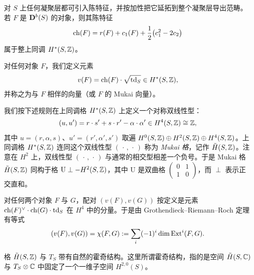 对 $S$ 上任何凝聚层都可引入陈特征，并按加性把它延拓到整个凝聚层导出范畴。若 $F$ 是 $\mathbf{D}^{b}(S)$ 的对象，则其陈特征
\begin{equation*}
\operatorname{ch}(F)=r(F)+c_1(F)+\frac{1}{2}\bigl(c_1^2-2c_2\bigr)
\end{equation*}
属于整上同调 $H^*(S,\mathbb{Z})$。

对任何对象 $F$，我们定义元素
\begin{equation*}
v(F)=\operatorname{ch}(F)\cdot\sqrt{\operatorname{td}_S}\in H^*(S,\mathbb{Z}),
\end{equation*}
并称之为与 $F$ 相伴的向量（或 $F$ 的 Mukai 向量）。

我们按下述规则在上同调格 $H^*(S,\mathbb{Z})$ 上定义一个对称双线性型：
\begin{equation*}
(u,u')=r\cdot s'+s\cdot r'-\alpha\cdot\alpha'\in H^4(S,\mathbb{Z})\cong\mathbb{Z},
\end{equation*}
其中 $u=(r,\alpha,s)$、$u'=(r',\alpha',s')$ 取遍 $H^0(S,\mathbb{Z})\oplus H^2(S,\mathbb{Z})\oplus H^4(S,\mathbb{Z})$。上同调格 $H^*(S,\mathbb{Z})$ 连同这个双线性型 $(\,\cdot\,,\,\cdot\,)$ 称为 \emph{Mukai 格}，记作 $\tilde H(S,\mathbb{Z})$。注意在 $H^2$ 上，双线性型 $(\,\cdot\,,\,\cdot\,)$ 与通常的相交型相差一个负号。于是 Mukai 格 $\tilde H(S,\mathbb{Z})$ 同构于格 $\mathrm{U}\perp -H^2(S,\mathbb{Z})$，其中 $\mathrm{U}$ 是双曲格 $\begin{pmatrix}0&1\\1&0\end{pmatrix}$，而 $\perp$ 表示正交直和。



对任何两个对象 $F$ 与 $G$，配对 $(v(F),v(G))$ 按定义是元素 $\operatorname{ch}(F)^{\vee}\cdot\operatorname{ch}(G)\cdot\operatorname{td}_S$ 在 $H^4$ 中的分量。于是由 Grothendieck--Riemann--Roch 定理有等式
\begin{equation*}
(v(F),v(G))=\chi(F,G):=\sum_i(-1)^i\dim\operatorname{Ext}^i(F,G).
\end{equation*}

格 $\tilde H(S,\mathbb{Z})$ 与 $T_S$ 带有自然的霍奇结构。这里所谓霍奇结构，指的是空间 $\tilde H(S,\mathbb{C})$ 与 $T_S\otimes\mathbb{C}$ 中固定了一个一维子空间 $H^{2,0}(S)$。

